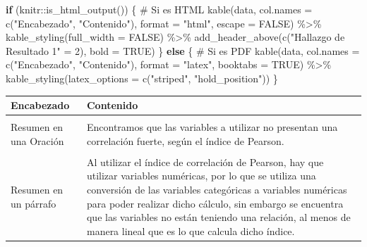 \documentclass[
  letterpaper,
  DIV=11,
  numbers=noendperiod]{scrreprt}
\newenvironment{Shaded}{\begin{snugshade}}{\end{snugshade}}
\newcommand{\AttributeTok}[1]{\textcolor[rgb]{0.40,0.45,0.13}{#1}}
\newcommand{\CommentTok}[1]{\textcolor[rgb]{0.37,0.37,0.37}{#1}}
\newcommand{\ConstantTok}[1]{\textcolor[rgb]{0.56,0.35,0.01}{#1}}
\newcommand{\ControlFlowTok}[1]{\textcolor[rgb]{0.00,0.23,0.31}{\textbf{#1}}}
\newcommand{\DecValTok}[1]{\textcolor[rgb]{0.68,0.00,0.00}{#1}}
\newcommand{\FunctionTok}[1]{\textcolor[rgb]{0.28,0.35,0.67}{#1}}
\newcommand{\NormalTok}[1]{\textcolor[rgb]{0.00,0.23,0.31}{#1}}
\newcommand{\OtherTok}[1]{\textcolor[rgb]{0.00,0.23,0.31}{#1}}
\newcommand{\SpecialCharTok}[1]{\textcolor[rgb]{0.37,0.37,0.37}{#1}}
\newcommand{\StringTok}[1]{\textcolor[rgb]{0.13,0.47,0.30}{#1}}
\begin{document}
\begin{Shaded}
\begin{Highlighting}[]
\ControlFlowTok{if}\NormalTok{ (knitr}\SpecialCharTok{::}\FunctionTok{is\_html\_output}\NormalTok{()) \{}
  \CommentTok{\# Si es HTML}
  \FunctionTok{kable}\NormalTok{(data, }\AttributeTok{col.names =} \FunctionTok{c}\NormalTok{(}\StringTok{"Encabezado"}\NormalTok{, }\StringTok{"Contenido"}\NormalTok{), }
        \AttributeTok{format =} \StringTok{"html"}\NormalTok{, }
        \AttributeTok{escape =} \ConstantTok{FALSE}\NormalTok{) }\SpecialCharTok{\%\textgreater{}\%}
    \FunctionTok{kable\_styling}\NormalTok{(}\AttributeTok{full\_width =} \ConstantTok{FALSE}\NormalTok{) }\SpecialCharTok{\%\textgreater{}\%}
    \FunctionTok{add\_header\_above}\NormalTok{(}\FunctionTok{c}\NormalTok{(}\StringTok{"Hallazgo de Resultado 1"} \OtherTok{=} \DecValTok{2}\NormalTok{), }\AttributeTok{bold =} \ConstantTok{TRUE}\NormalTok{)}
\NormalTok{\} }\ControlFlowTok{else}\NormalTok{ \{}
  \CommentTok{\# Si es PDF}
  \FunctionTok{kable}\NormalTok{(data, }\AttributeTok{col.names =} \FunctionTok{c}\NormalTok{(}\StringTok{"Encabezado"}\NormalTok{, }\StringTok{"Contenido"}\NormalTok{), }
        \AttributeTok{format =} \StringTok{"latex"}\NormalTok{, }
        \AttributeTok{booktabs =} \ConstantTok{TRUE}\NormalTok{) }\SpecialCharTok{\%\textgreater{}\%}
    \FunctionTok{kable\_styling}\NormalTok{(}\AttributeTok{latex\_options =} \FunctionTok{c}\NormalTok{(}\StringTok{"striped"}\NormalTok{, }\StringTok{"hold\_position"}\NormalTok{))}
\NormalTok{\}}
\end{Highlighting}
\end{Shaded}

\begin{table}[!h]
\centering
\begin{tabular}{ll}
\toprule
Encabezado & Contenido\\
\midrule
\cellcolor{gray!10}{Nombre de Su hallazgo} & \cellcolor{gray!10}{Poca Correlación entre las variables.}\\
Resumen en una Oración & Encontramos que las variables a utilizar no presentan una correlación fuerte, según el índice de Pearson.\\
\cellcolor{gray!10}{Problemas o Posibles Desafíos} & \cellcolor{gray!10}{La conversión de variable categórica a variable numérica puede estar afectando al resultado. Además, podría ser que la relación entre las variables en realidad no es lineal.}\\
Resumen en un párrafo & Al utilizar el índice de correlación de Pearson, hay que utilizar variables numéricas, por lo que se utiliza una conversión de las variables categóricas a variables numéricas para poder realizar dicho cálculo, sin embargo se encuentra que las variables no están teniendo una relación, al menos de manera lineal que es lo que calcula dicho índice.\\
\bottomrule
\end{tabular}
\end{table}
\end{document}
